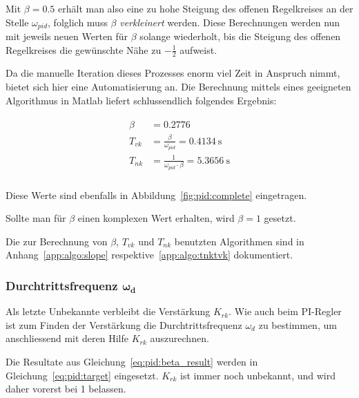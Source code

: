 Mit  $\beta  = 0.5$  erh\"alt  man  also eine  zu  hohe  Steigung des  offenen
Regelkreises   an    der   Stelle  $\omega_{pid}$,   folglich   muss   $\beta$
\emph{verkleinert} werden.   Diese Berechnungen  werden nun mit  jeweils neuen
Werten  f\"ur  $\beta$  solange  wiederholt,  bis  die  Steigung  des  offenen
Regelkreises die gew\"unschte N\"ahe zu $-\frac{1}{2}$ aufweist.

Da die manuelle Iteration dieses Prozesses  enorm viel Zeit in Anspruch nimmt,
bietet  sich  hier  eine  Automatisierung  an. Die  Berechnung  mittels  eines
geeigneten Algorithmus in Matlab liefert schlussendlich folgendes Ergebnis:

\begin{gather} \label{eq:pid:beta_result}
    \begin{split}
        \beta    & = 0.2776 \\
        {T_{vk}} & = \frac{\beta}{\omega_{pid}}           = \SI{0.4134}{\second} \\
        {T_{nk}} & = \frac{1}{\omega_{pid} \cdot \beta}   = \SI{5.3656}{\second} \\
    \end{split}
\end{gather}

Diese Werte sind ebenfalls in Abbildung~\ref{fig:pid:complete} eingetragen.

Sollte  man  f\"ur  $\beta$  einen komplexen  Wert  erhalten,  wird  $\beta=1$
gesetzt.

Die zur  Berechnung von $\beta$,  $T_{vk}$ und $T_{nk}$  benutzten Algorithmen
sind    in     Anhang~\ref{app:algo:slope}    respektive~\ref{app:algo:tnktvk}
dokumentiert.


\subsubsection{Durchtrittsfrequenz $\mathbf{\boldsymbol{\omega}_d}$}

Als  letzte Unbekannte  verbleibt  die Verst\"arkung  $K_{rk}$. Wie auch  beim
PI-Regler ist zum Finden  der Verst\"arkung die Durchtrittsfrequenz $\omega_d$
zu bestimmen, um anschliessend mit deren Hilfe $K_{rk}$ auszurechnen.

Die    Resultate    aus     Gleichung~\ref{eq:pid:beta_result}    werden    in
Gleichung~\ref{eq:pid:target} eingesetzt. $K_{rk}$  ist immer  noch unbekannt,
und wird daher vorerst bei 1 belassen.

